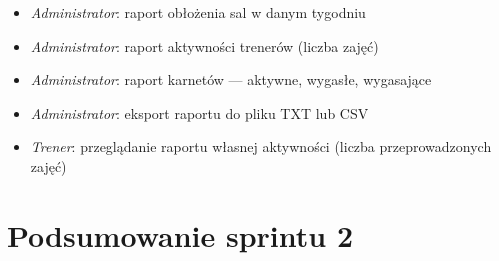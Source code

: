 \documentclass[11pt, a4paper]{article}
\newcommand{\actor}[1]{\textit{\color{secondary}#1}}
\begin{document}
\medskip

\begin{tcolorbox}[epicbox, title={Epik 5 — Moduł raportów}]
\begin{itemize}[leftmargin=*, itemsep=2pt, label=\color{secondary}$\triangleright$]
  \item \actor{Administrator}: raport obłożenia sal w danym tygodniu
  \item \actor{Administrator}: raport aktywności trenerów (liczba zajęć)
  \item \actor{Administrator}: raport karnetów — aktywne, wygasłe, wygasające
  \item \actor{Administrator}: eksport raportu do pliku TXT lub CSV
  \item \actor{Trener}: przeglądanie raportu własnej aktywności (liczba przeprowadzonych zajęć)
\end{itemize}
\end{tcolorbox}

\newpage
\section{Podsumowanie sprintu 2}
\end{document}
